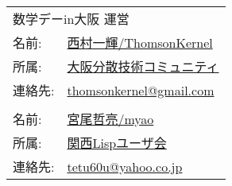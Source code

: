 \documentclass[b5paper,fleqn]{ltjsarticle}
\begin{document}
\newpage
\thispagestyle{empty}
\begin{flushright}
\begin{minipage}{0.5\hsize}
  \begin{tabular}{|ll}
  \multicolumn{2}{|l}{数学デーin大阪 運営}\\[10pt]
  名前: &\href{https://twitter.com/ThomsonKernel}{西村一輝/ThomsonKernel}\\
  所属: &\href{https://sites.google.com/view/osaka-dtc}{大阪分散技術コミュニティ}\\
  連絡先: & \href{mailto:thomsonkernel@gmail.com}{thomsonkernel@gmail.com}\\
  \\
  名前: &\href{https://twitter.com/myao_s_moking}{宮尾哲亮/myao}\\
  所属: &\href{https://kansai-lisp-useres.connpass.com}{関西Lispユーザ会}\\
  連絡先: & \href{mailto:tetu60u@yahoo.co.jp}{tetu60u@yahoo.co.jp}
  \end{tabular}
\end{minipage}
\end{flushright}
\end{document}
